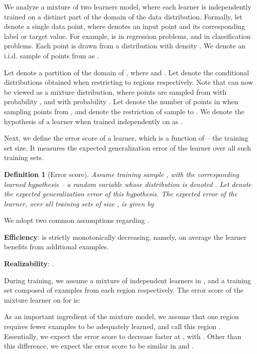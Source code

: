 \documentclass{article}
\newtheorem{defn}{Definition}
\begin{document}
We analyze a mixture of two learners model, where each learner is independently trained on a distinct part of the domain of the data distribution. Formally, let  denote a single data point, where  denotes an input point and  its corresponding label or target value. For example,  is  in regression problems, and  in classification problems. Each point  is drawn from a distribution  with density . We denote an i.i.d. sample of  points from  as .

Let  denote a partition of the domain of , where  and . 
Let  denote the conditional distributions obtained when restricting  to regions  respectively. Note that  can now be viewed as a mixture distribution, where points are sampled from  with probability  , and  with probability .
Let  denote the number of points in  when sampling  points from , and  denote  the restriction of sample  to . We denote the hypothesis of a learner when trained independently on  as .

Next, we define the error score of a learner, which is a function of  -- the training set size. It measures the expected generalization error of the learner over all such training sets.
\begin{defn}[Error score] 
Assume training sample , with the corresponding learned hypothesis  -- a random variable whose distribution is denoted . Let  denote the expected generalization error of this hypothesis. The expected error of the learner, over all training sets of size , is given by

\label{def:expected-error}
\vspace{-.5cm}
\end{defn} 

We adopt two common assumptions regarding . \begin{inparaenum}[(i)] \item  \textbf{Efficiency}:  is strictly monotonically decreasing, namely, on average the learner benefits from additional examples. \item \textbf{Realizability}: . \end{inparaenum}

During training, we assume a mixture of independent learners in , and a training set composed of  examples from each region respectively. The error score of the mixture learner on  for  is:

As an important ingredient of the mixture model, we assume that one region requires fewer examples to be adequately learned, and call this region . Essentially, we expect the error score to decrease faster at , with . Other than this difference, we expect the error score to be similar in  and . 
\end{document}
